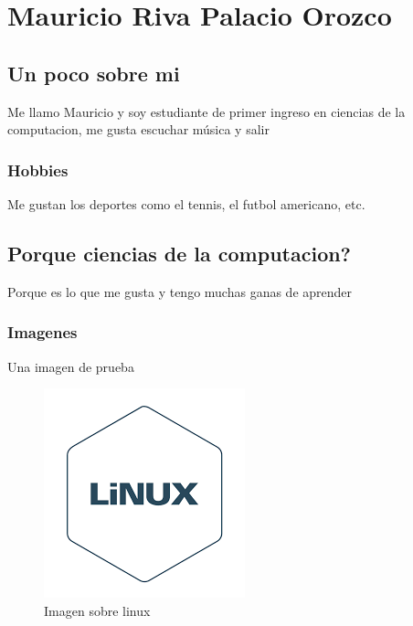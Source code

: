 \chapter{Mauricio Riva Palacio Orozco}

\section{Un poco sobre mi}
Me llamo Mauricio y soy estudiante de primer ingreso en ciencias de la computacion, me gusta escuchar música y salir 

\subsection{Hobbies}
Me gustan los deportes como el tennis, el futbol americano, etc. 

\section{Porque ciencias de la computacion?}
Porque es lo que me gusta y tengo muchas ganas de aprender

\subsection{Imagenes}
Una imagen de prueba

\begin{figure}[b]
  \centering
  \includegraphics[scale=0.5]{IMGA/linux.png}
  \caption{Imagen sobre linux}
\end{figure}

